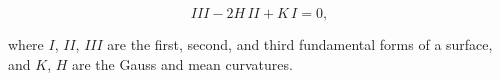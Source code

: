 $$III - 2H \, II + K \, I = 0,$$

where $I$, $II$, $III$ are the first, second, and third fundamental forms of a surface, and $K$, $H$ are the Gauss and mean curvatures.

